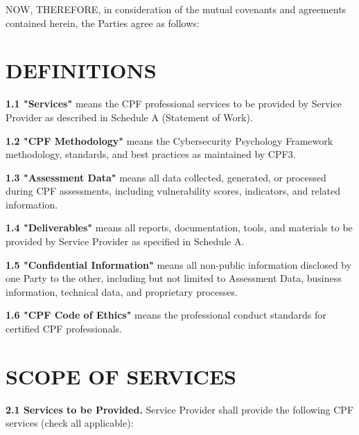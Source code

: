 \documentclass[11pt,a4paper]{article}
\begin{document}
NOW, THEREFORE, in consideration of the mutual covenants and agreements contained herein, the Parties agree as follows:

\section{DEFINITIONS}

\textbf{1.1 "Services"} means the CPF professional services to be provided by Service Provider as described in Schedule A (Statement of Work).

\textbf{1.2 "CPF Methodology"} means the Cybersecurity Psychology Framework methodology, standards, and best practices as maintained by CPF3.

\textbf{1.3 "Assessment Data"} means all data collected, generated, or processed during CPF assessments, including vulnerability scores, indicators, and related information.

\textbf{1.4 "Deliverables"} means all reports, documentation, tools, and materials to be provided by Service Provider as specified in Schedule A.

\textbf{1.5 "Confidential Information"} means all non-public information disclosed by one Party to the other, including but not limited to Assessment Data, business information, technical data, and proprietary processes.

\textbf{1.6 "CPF Code of Ethics"} means the professional conduct standards for certified CPF professionals.

\section{SCOPE OF SERVICES}

\textbf{2.1 Services to be Provided.} Service Provider shall provide the following CPF services (check all applicable):
\end{document}
